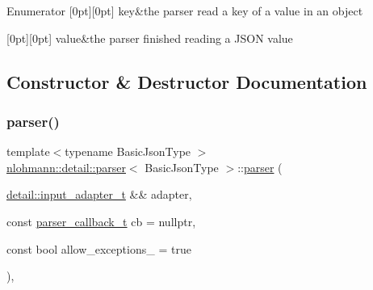 \begin{DoxyEnumFields}{Enumerator}
[0pt][0pt]{}\mbox{\label{classnlohmann_1_1detail_1_1parser_a37ac88c864dda495f72cb62776b0bebea3c6e0b8a9c15224a8228b9a98ca1531d}} 
key&the parser read a key of a value in an object \\
\hline

[0pt][0pt]{}\mbox{\label{classnlohmann_1_1detail_1_1parser_a37ac88c864dda495f72cb62776b0bebea2063c1608d6e0baf80249c42e2be5804}} 
value&the parser finished reading a J\+S\+ON value \\
\hline

\end{DoxyEnumFields}


\subsection{Constructor \& Destructor Documentation}
\mbox{\label{classnlohmann_1_1detail_1_1parser_a1a2bd258b7e99f86b7e6a3c41373ba55}} 
\subsubsection{\texorpdfstring{parser()}{parser()}}
{\footnotesize\ttfamily template$<$typename Basic\+Json\+Type $>$ \\
\mbox{\hyperlink{classnlohmann_1_1detail_1_1parser}{nlohmann\+::detail\+::parser}}$<$ Basic\+Json\+Type $>$\+::\mbox{\hyperlink{classnlohmann_1_1detail_1_1parser}{parser}} (\begin{DoxyParamCaption}\item[{\mbox{\hyperlink{namespacenlohmann_1_1detail_ae132f8cd5bb24c5e9b40ad0eafedf1c2}{detail\+::input\+\_\+adapter\+\_\+t}} \&\&}]{adapter,  }\item[{const \mbox{\hyperlink{classnlohmann_1_1detail_1_1parser_ad250ad4f2b4af4a497e727c963162ff1}{parser\+\_\+callback\+\_\+t}}}]{cb = {\ttfamily nullptr},  }\item[{const bool}]{allow\+\_\+exceptions\+\_\+ = {\ttfamily true} }\end{DoxyParamCaption})\hspace{0.3cm}{\ttfamily [inline]}, {\ttfamily [explicit]}}



